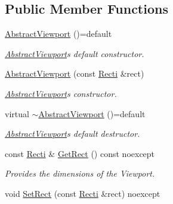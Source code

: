 \subsection*{Public Member Functions}
\begin{DoxyCompactItemize}
\item 
\mbox{\label{class_blade_1_1_abstract_viewport_a0962406e3c44affa7efd1f7d9175a1d4}} 
\hyperlink{class_blade_1_1_abstract_viewport_a0962406e3c44affa7efd1f7d9175a1d4}{Abstract\+Viewport} ()=default
\begin{DoxyCompactList}\small\item\em \hyperlink{class_blade_1_1_abstract_viewport}{Abstract\+Viewport}\textquotesingle{}s default constructor. \end{DoxyCompactList}\item 
\hyperlink{class_blade_1_1_abstract_viewport_aa04544ba6e933bc0e6c2e6ca878d4541}{Abstract\+Viewport} (const \hyperlink{namespace_blade_ac765e9c5c8205009994e4243d9d6f81c}{Recti} \&rect)
\begin{DoxyCompactList}\small\item\em \hyperlink{class_blade_1_1_abstract_viewport}{Abstract\+Viewport}\textquotesingle{}s constructor. \end{DoxyCompactList}\item 
\mbox{\label{class_blade_1_1_abstract_viewport_abb8e72341ffca5fb5bd9b2891a959612}} 
virtual \hyperlink{class_blade_1_1_abstract_viewport_abb8e72341ffca5fb5bd9b2891a959612}{$\sim$\+Abstract\+Viewport} ()=default
\begin{DoxyCompactList}\small\item\em \hyperlink{class_blade_1_1_abstract_viewport}{Abstract\+Viewport}\textquotesingle{}s default destructor. \end{DoxyCompactList}\item 
const \hyperlink{namespace_blade_ac765e9c5c8205009994e4243d9d6f81c}{Recti} \& \hyperlink{class_blade_1_1_abstract_viewport_abd3c922bb2552224fccea3f940160f05}{Get\+Rect} () const noexcept
\begin{DoxyCompactList}\small\item\em Provides the dimensions of the Viewport. \end{DoxyCompactList}\item 
void \hyperlink{class_blade_1_1_abstract_viewport_af229a400e575300684e8f84794ba299d}{Set\+Rect} (const \hyperlink{namespace_blade_ac765e9c5c8205009994e4243d9d6f81c}{Recti} \&rect) noexcept

\end{DoxyCompactItemize}
